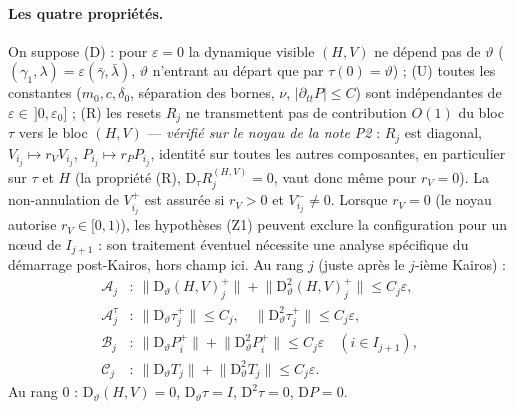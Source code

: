 \documentclass[11pt,a4paper]{article}
\theoremstyle{remark}
\newcommand{\vth}{\vartheta}
\newcommand{\D}{\mathrm D}
\begin{document}
\paragraph{Les quatre propriétés.} On suppose (D) : pour $\varepsilon=0$ la dynamique visible $(H,V)$ ne dépend pas de $\vth$ ($(\gamma_1,\lambda)=\varepsilon(\bar\gamma,\bar\lambda)$, $\vth$ n'entrant au départ que par $\tau(0)=\vth$) ; (U) toutes les constantes ($m_0,c,\delta_0$, séparation des bornes, $\nu$, $\lvert\partial_{tt}P\rvert\le C$) sont indépendantes de $\varepsilon\in\,]0,\varepsilon_0]$ ; (R) les resets $R_j$ ne transmettent pas de contribution $O(1)$ du bloc $\tau$ vers le bloc $(H,V)$ --- \emph{vérifié sur le noyau de la note P2} : $R_j$ est diagonal, $V_{i_j}\mapsto r_VV_{i_j}$, $P_{i_j}\mapsto r_PP_{i_j}$, identité sur toutes les autres composantes, en particulier sur $\tau$ et $H$ (la propriété (R), $\D_\tau R_j^{(H,V)}=0$, vaut donc même pour $r_V=0$). La non-annulation de $V^+_{i_j}$ est assurée si $r_V>0$ et $V^-_{i_j}\ne0$. Lorsque $r_V=0$ (le noyau autorise $r_V\in[0,1)$), les hypothèses (Z1) peuvent exclure la configuration pour un nœud de $I_{j+1}$ : son traitement éventuel nécessite une analyse spécifique du démarrage post-Kairos, hors champ ici. Au rang $j$ (juste après le $j$-ième Kairos) :
\[
\begin{aligned}
\mathcal A_j&:\ \lVert\D_\vth(H,V)_j^+\rVert+\lVert\D^2_\vth(H,V)_j^+\rVert\le C_j\varepsilon,\\
\mathcal A^\tau_j&:\ \lVert\D_\vth\tau_j^+\rVert\le C_j,\quad\lVert\D^2_\vth\tau_j^+\rVert\le C_j\varepsilon,\\
\mathcal B_j&:\ \lVert\D_\vth P_i^+\rVert+\lVert\D^2_\vth P_i^+\rVert\le C_j\varepsilon\quad(i\in I_{j+1}),\\
\mathcal C_j&:\ \lVert\D_\vth T_j\rVert+\lVert\D^2_\vth T_j\rVert\le C_j\varepsilon .
\end{aligned}
\]
Au rang $0$ : $\D_\vth(H,V)=0$, $\D_\vth\tau=I$, $\D^2\tau=0$, $\D P=0$.
\end{document}
